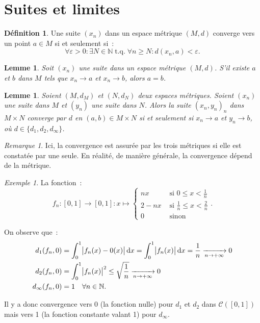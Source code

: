 \documentclass{report}
\newtheorem{lem}[thm]{Lemme}
\theoremstyle{definition}
\newtheorem{déf}[thm]{Définition}
\theoremstyle{remark}
\newtheorem*{rmq}{Remarque}
\newtheorem{ex}{Exemple}[chapter]
\DeclareMathOperator{\tq}{\text{ t.q. }}
\newcommand{\cont}[2]{\mathcal C\left(\left[#1, #2\right]\right)}
\newcommand{\N}{\mathbb N}
\newcommand{\pinfty}{{+\infty}}
\newcommand{\mconv}[2]{\xrightarrow[#1 \to #2]{}}
\begin{document}
	\section{Suites et limites}
		\begin{déf} Une suite $(x_n)$ dans un espace métrique $(M, d)$ converge vers un point $a \in M$ si et seulement si~:
		\[\forall \varepsilon > 0 : \exists N \in \N \tq \forall n \geq N : d(x_n, a) < \varepsilon.\]
		\end{déf}

		\begin{lem} Soit $(x_n)$ une suite dans un espace métrique $(M, d)$. S'il existe $a$ et $b$ dans $M$ tels que $x_n \to a$ et $x_n \to b$, alors $a=b$.
		\end{lem}

		\begin{lem} Soient $(M, d_M)$ et $(N, d_N)$ deux espaces métriques. Soient $(x_n)$ une suite dans $M$ et $(y_n)$ une suite dans $N$. Alors la suite
		$(x_n, y_n)_n$ dans $M \times N$ converge par $d$ en $(a, b) \in M \times N$ si et seulement si $x_n \to a$ et $y_n \to b$, où
		$d \in \{d_1, d_2, d_\infty\}$. \end{lem}

		\begin{rmq} Ici, la convergence est assurée par les trois métriques si elle est constatée par une seule. En réalité, de manière générale, la convergence
		dépend de la métrique. \end{rmq}

		\begin{ex} La fonction~:
		\[f_n : [0, 1] \to [0, 1] : x \mapsto
			\begin{cases}nx &\text{ si } 0 \leq x < \frac 1n \\2-nx &\text{ si } \frac 1n \leq x < \frac 2n \\0 &\text{ sinon}\end{cases}.\]

		On observe que~:
		\begin{align*}
			d_1(f_n, 0) &= \int_0^1\abs{f_n(x) - 0(x)}\dif x = \int_0^1\abs {f_n(x)}\dif x = \frac 1n \mconv n\pinfty 0 \\
			d_2(f_n, 0) &= \int_0^1\abs{f_n(x)}^2 \leq \sqrt{\frac 1n} \mconv n\pinfty 0 \\
			d_\infty(f_n, 0) &= 1 \quad \forall n \in \N.
		\end{align*}

		Il y a donc convergence vers 0 (la fonction nulle) pour $d_1$ et $d_2$ dans $\cont 01$ mais vers 1 (la fonction constante valant 1)
		pour $d_\infty$. \end{ex}
\end{document}
